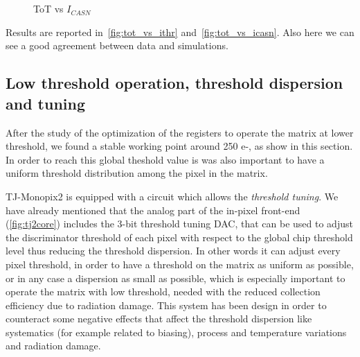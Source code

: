 \begin{figure}[h!]
\centering
{}\\%
{}\\
\caption{ToT vs $I_{CASN}$}
\label{fig:tot_vs_icasn}
\end{figure}

Results are reported in~\autoref{fig:tot_vs_ithr} and~\autoref{fig:tot_vs_icasn}. Also here we can see a good agreement between data and simulations.

\subsection{Low threshold operation, threshold dispersion and tuning} \label{sec:tuning}

After the study of the optimization of the registers to operate the matrix at lower threshold,  we found a stable working point around 250 e-, as show in this section. In order to reach this global theshold value is was also important to have a uniform threshold distribution among the pixel in the matrix. 

TJ-Monopix2 is equipped with a circuit which allows the \textit{threshold tuning}. We have already mentioned that the analog part of the in-pixel front-end (\autoref{fig:tj2core}) includes the 3-bit threshold tuning DAC, that can be used to adjust the discriminator threshold of each pixel with respect to the global chip threshold level thus reducing the threshold dispersion. In other words it can adjust every pixel threshold, in order to have a threshold on the matrix as uniform as possible, or in any case a dispersion as small as possible, which is especially important to operate the matrix with low threshold, needed with the reduced collection efficiency due to radiation damage.  This system has been design in order to counteract some negative effects that affect the threshold dispersion like systematics (for example related to biasing), process and temperature variations and radiation damage. \\

